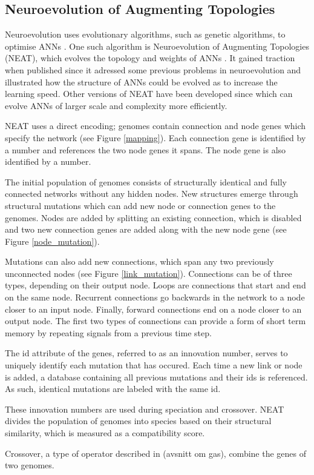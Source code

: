 \newpage

\subsection{Neuroevolution of Augmenting Topologies}
Neuroevolution uses evolutionary algorithms, such as genetic algorithms, to optimise ANNs \cite{neuroevolution_review}.
One such algorithm is Neuroevolution of Augmenting Topologies (NEAT), which evolves the topology and weights of ANNs \cite{neat_main, neat_short, neat_phd}.
It gained traction when published since it adressed some previous problems in neuroevolution and illustrated how the structure of ANNs could be
evolved as to increase the learning speed. Other versions of NEAT have been developed since which can evolve ANNs of larger scale and complexity more efficiently.

NEAT uses a direct encoding; genomes contain connection and node genes which specify the network (see Figure \ref{mapping}). Each connection gene is identified
by a number and references the two node genes it spans. The node gene is also identified by a number.



The initial population of genomes consists of structurally identical and fully connected networks without any hidden nodes.
New structures emerge through structural mutations which can add new node or connection genes to the genomes. Nodes are added by splitting an existing
connection, which is disabled and two new connection genes are added along with the new node gene (see Figure \ref{node_mutation}).



Mutations can also add new connections, which span any two previously unconnected nodes (see Figure \ref{link_mutation}).
Connections can be of three types, depending on their output node. Loops are connections that start and end on the same node. Recurrent connections go backwards in the network to a node closer to an
input node. Finally, forward connections end on a node closer to an output node. The first two types of connections can provide a form of short term memory by repeating
signals from a previous time step.



The id attribute of the genes, referred to as an innovation number, serves to uniquely identify each mutation that has occured.
Each time a new link or node is added, a database containing all previous mutations and their ids is referenced.
As such, identical mutations are labeled with the same id.

These innovation numbers are used during speciation and crossover. NEAT divides the population of genomes into species based on their structural
similarity, which is measured as a compatibility score.

Crossover, a type of operator described in (avsnitt om gas), combine the genes of two genomes.



